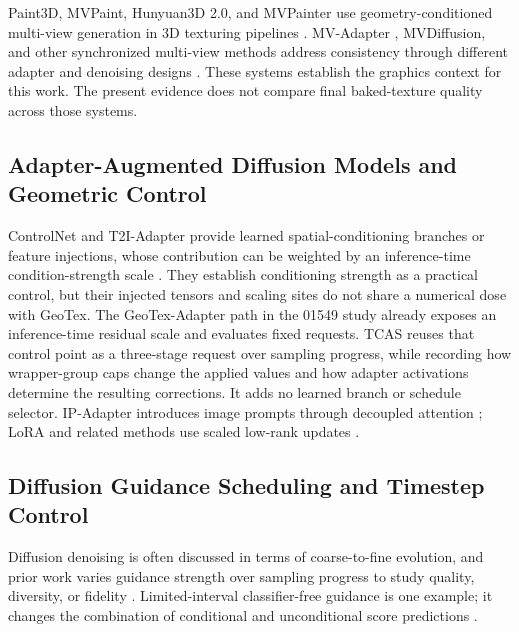 \documentclass[times,twocolumn,final]{elsarticle}
\providecommand{\DIFadd}[1]{{\protect\color{blue} \sf #1}} %
\providecommand{\DIFaddbegin}{} %
\providecommand{\DIFaddend}{} %
\begin{document}
  Paint3D, MVPaint, Hunyuan3D 2.0, and MVPainter   \DIFaddbegin \DIFadd{use geometry-conditioned }\DIFaddend multi-view   \DIFaddbegin \DIFadd{generation in 3D texturing pipelines }\DIFaddend \cite{zeng2024paint3d,cheng2024mvpaint,lai2025hunyuan3d,shao2025mvpainter}. MV-Adapter  \DIFaddbegin \DIFadd{, MVDiffusion, and other }\DIFaddend synchronized multi-view   \DIFaddbegin \DIFadd{methods address consistency through different adapter and denoising designs \cite{huang2024mvadapter,tang2023mvdiffusion,liu2024synchronized,xu2026wondertex}. These systems establish the graphics context for this work. The present evidence does not compare final baked-texture quality across those systems}\DIFaddend .

  \DIFaddbegin \subsection{Adapter-Augmented Diffusion Models and Geometric Control}
\DIFaddend \label{subsec:adapter}

  \DIFaddbegin \DIFadd{ControlNet and }\DIFaddend T2I-Adapter   \DIFaddbegin \DIFadd{provide learned spatial-conditioning branches or feature injections, whose contribution can be weighted by an inference-time condition-strength scale \cite{mou2023t2iadapter,zhang2023controlnet}. They establish conditioning strength as a practical control, but their injected tensors and scaling sites do not share a numerical dose with GeoTex. The GeoTex-Adapter path in the 01549 study already exposes an inference-time residual scale and evaluates fixed requests. TCAS reuses that control point as a three-stage request over sampling progress, while recording how wrapper-group caps change the applied values and how adapter activations determine the resulting corrections. It adds no learned branch or schedule selector}\DIFaddend . IP-Adapter introduces image prompts through decoupled attention \cite{ye2023ipadapter}  \DIFaddbegin \DIFadd{; LoRA and related methods use scaled }\DIFaddend low-rank   updates \cite{hu2022lora,liu2024dora,zhang2023adalora}.
 
 

\subsection{Diffusion Guidance Scheduling and Timestep Control}
\label{subsec:guidance}

  \DIFaddbegin \DIFadd{Diffusion denoising is often discussed in terms of coarse-to-fine evolution, and prior work varies guidance strength over sampling progress to study quality, diversity, or fidelity \cite{ho2020ddpm,song2021ddim,ho2022cfg,castillo2023adaptive}. Limited-interval }\DIFaddend classifier-free   \DIFaddbegin \DIFadd{guidance is one example; it changes the combination of conditional and unconditional score predictions \cite{kynkanniemi2024limited}.
}\DIFaddend 
\end{document}
